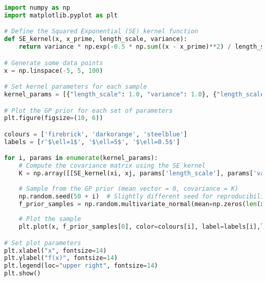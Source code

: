 \documentclass[12pt,a4paper]{article}
\begin{document}
\vspace{10pt}
\begin{lstlisting}[language=python, caption={Code of the Creation of Figures \ref{fig:SE samples diff lengthscale plot}}]
import numpy as np
import matplotlib.pyplot as plt

# Define the Squared Exponential (SE) kernel function
def SE_kernel(x, x_prime, length_scale, variance):
    return variance * np.exp(-0.5 * np.sum((x - x_prime)**2) / length_scale**2)

# Generate some data points
x = np.linspace(-5, 5, 100)

# Set kernel parameters for each sample
kernel_params = [{"length_scale": 1.0, "variance": 1.0}, {"length_scale": 2.0, "variance": 1.0},{"length_scale": 0.5, "variance": 1.0}]

# Plot the GP prior for each set of parameters
plt.figure(figsize=(10, 6))

colours = ['firebrick', 'darkorange', 'steelblue']
labels = [r'$\ell=1$', '$\ell=5$', '$\ell=0.5$']

for i, params in enumerate(kernel_params):
    # Compute the covariance matrix using the SE kernel
    K = np.array([[SE_kernel(xi, xj, params['length_scale'], params['variance']) for xj in x] for xi in x])
    
    # Sample from the GP prior (mean vector = 0, covariance = K)
    np.random.seed(50 + i)  # Slightly different seed for reproducibility
    f_prior_samples = np.random.multivariate_normal(mean=np.zeros(len(x)), cov=K, size=1)
    
    # Plot the sample
    plt.plot(x, f_prior_samples[0], color=colours[i], label=labels[i],linewidth=3)

# Set plot parameters
plt.xlabel("x", fontsize=14)
plt.ylabel("f(x)", fontsize=14)
plt.legend(loc="upper right", fontsize=14)
plt.show()
\end{lstlisting}
\end{document}
